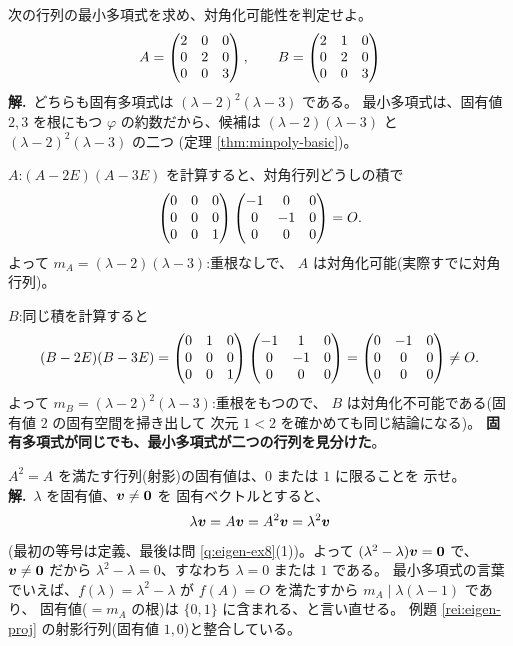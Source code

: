 \begin{rei}[例題・標準(最小多項式の計算)]\label{rei:ch-minpoly-3x3}
次の行列の最小多項式を求め、対角化可能性を判定せよ。
\[
A = \begin{pmatrix}2 & 0 & 0 \\ 0 & 2 & 0 \\ 0 & 0 & 3\end{pmatrix}, \qquad
B = \begin{pmatrix}2 & 1 & 0 \\ 0 & 2 & 0 \\ 0 & 0 & 3\end{pmatrix}
\]
\textbf{解.}\ どちらも固有多項式は $(\lambda - 2)^2(\lambda - 3)$ である。
最小多項式は、固有値 $2, 3$ を根にもつ $\varphi$ の約数だから、候補は
$(\lambda - 2)(\lambda - 3)$ と $(\lambda - 2)^2(\lambda - 3)$ の二つ
(定理 \ref{thm:minpoly-basic})。

$A$:$(A - 2E)(A - 3E)$ を計算すると、対角行列どうしの積で
\[
\begin{pmatrix}0 & 0 & 0 \\ 0 & 0 & 0 \\ 0 & 0 & 1\end{pmatrix}\begin{pmatrix}-1 & 0 & 0 \\ 0 & -1 & 0 \\ 0 & 0 & 0\end{pmatrix}
= O.
\]
よって $m_A = (\lambda - 2)(\lambda - 3)$:重根なしで、
$A$ は対角化可能(実際すでに対角行列)。

$B$:同じ積を計算すると
\[
(B - 2E)(B - 3E)
= \begin{pmatrix}0 & 1 & 0 \\ 0 & 0 & 0 \\ 0 & 0 & 1\end{pmatrix}
\begin{pmatrix}-1 & 1 & 0 \\ 0 & -1 & 0 \\ 0 & 0 & 0\end{pmatrix}
= \begin{pmatrix}0 & -1 & 0 \\ 0 & 0 & 0 \\ 0 & 0 & 0\end{pmatrix} \neq O.
\]
よって $m_B = (\lambda - 2)^2(\lambda - 3)$:重根をもつので、
$B$ は対角化不可能である(固有値 $2$ の固有空間を掃き出して
次元 $1 < 2$ を確かめても同じ結論になる)。
\textbf{固有多項式が同じでも、最小多項式が二つの行列を見分けた}。
\end{rei}

\begin{rei}[例題・標準(証明:$A^2 = A$ の固有値)]\label{rei:ch-proj-eigen}
$A^2 = A$ を満たす行列(射影)の固有値は、$0$ または $1$ に限ることを
示せ。\\
\textbf{解.}\ $\lambda$ を固有値、$\bm{v} \neq \bm{0}$ を
固有ベクトルとすると、
\[
\lambda\bm{v} = A\bm{v} = A^2\bm{v} = \lambda^2\bm{v}
\]
(最初の等号は定義、最後は問 \ref{q:eigen-ex8}(1))。よって
$(\lambda^2 - \lambda)\bm{v} = \bm{0}$ で、$\bm{v} \neq \bm{0}$
だから $\lambda^2 - \lambda = 0$、すなわち $\lambda = 0$ または $1$ である。
最小多項式の言葉でいえば、$f(\lambda) = \lambda^2 - \lambda$ が
$f(A) = O$ を満たすから $m_A \mid \lambda(\lambda - 1)$ であり、
固有値($= m_A$ の根)は $\{0, 1\}$ に含まれる、と言い直せる。
例題 \ref{rei:eigen-proj} の射影行列(固有値 $1, 0$)と整合している。
\end{rei}

